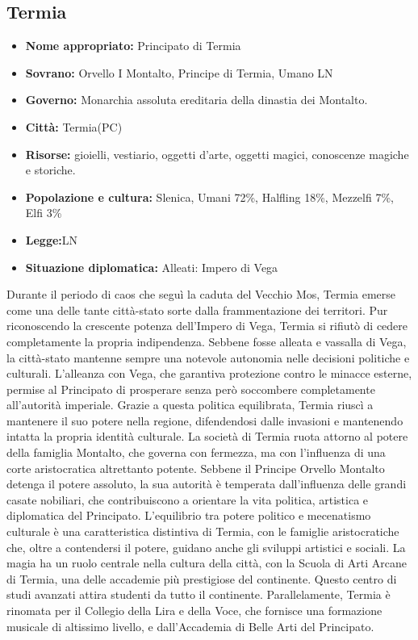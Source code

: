 \documentclass[10pt, a4paper]{report}
\begin{document}
\begin{multicols}{2}
\subsection*{Termia}
\begin{itemize}
	\item \textbf{Nome appropriato:} Principato di Termia
	\item \textbf{Sovrano:} Orvello I Montalto, Principe di Termia, Umano LN
	\item \textbf{Governo:} Monarchia assoluta ereditaria della dinastia dei Montalto.
	\item \textbf{Città:} Termia(PC)
	\item \textbf{Risorse:} gioielli, vestiario, oggetti d'arte, oggetti magici, conoscenze magiche e storiche.
	\item \textbf{Popolazione e cultura:} Slenica, Umani 72\%, Halfling 18\%, Mezzelfi 7\%, Elfi 3\%
	\item \textbf{Legge:}LN
	\item \textbf{Situazione diplomatica:} Alleati: Impero di Vega 
\end{itemize}
Durante il periodo di caos che seguì la caduta del Vecchio Mos, Termia emerse come una delle tante città-stato sorte dalla frammentazione dei territori. Pur riconoscendo la crescente potenza dell'Impero di Vega, Termia si rifiutò di cedere completamente la propria indipendenza. Sebbene fosse alleata e vassalla di Vega, la città-stato mantenne sempre una notevole autonomia nelle decisioni politiche e culturali.
L’alleanza con Vega, che garantiva protezione contro le minacce esterne, permise al Principato di prosperare senza però soccombere completamente all'autorità imperiale. Grazie a questa politica equilibrata, Termia riuscì a mantenere il suo potere nella regione, difendendosi dalle invasioni e mantenendo intatta la propria identità culturale.
La società di Termia ruota attorno al potere della famiglia Montalto, che governa con fermezza, ma con l'influenza di una corte aristocratica altrettanto potente. Sebbene il Principe Orvello Montalto detenga il potere assoluto, la sua autorità è temperata dall'influenza delle grandi casate nobiliari, che contribuiscono a orientare la vita politica, artistica e diplomatica del Principato. L'equilibrio tra potere politico e mecenatismo culturale è una caratteristica distintiva di Termia, con le famiglie aristocratiche che, oltre a contendersi il potere, guidano anche gli sviluppi artistici e sociali.
La magia ha un ruolo centrale nella cultura della città, con la Scuola di Arti Arcane di Termia, una delle accademie più prestigiose del continente. Questo centro di studi avanzati attira studenti da tutto il continente. Parallelamente, Termia è rinomata per il Collegio della Lira e della Voce, che fornisce una formazione musicale di altissimo livello, e dall'Accademia di Belle Arti del Principato.

\end{multicols}
\end{document}

